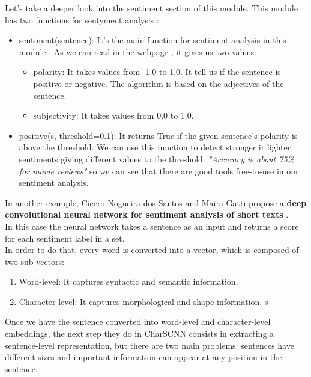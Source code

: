 \documentclass[12pt,twoside]{article}
\theoremstyle{plain}
\theoremstyle{definition}
\theoremstyle{remark}
\begin{document}
		Let's take a deeper look into the sentiment section of this module. This module has two functions for sentyment analysis \cite{python_module_sentiment}:
		
		\begin{itemize}
			\item sentiment(sentence): It's the main function for sentiment analysis in this module . As we can read in the webpage \cite{python_module_sentiment}, it gives us two values:
			
			\begin{itemize}
				\item polarity: It takes values from -1.0 to 1.0. It tell us if the sentence is positive or negative. The algorithm is based on the adjectives of the sentence.
				\item subjectivity: It takes values from 0.0 to 1.0.
			\end{itemize}
			
			\item positive(s, threshold=0.1): It returns True if the given sentence's polarity is above the threshold. We can use this function to detect stronger ir lighter sentiments giving different values to the threshold. \textit{"Accuracy is about 75\% for movie reviews" }\cite{python_module_sentiment} so we can see that there are good tools free-to-use in our sentiment analysis. 
		\end{itemize}
		
		In another example, Cicero Nogueira dos Santos and Maira Gatti propose a \textbf{deep convolutional neural network for sentiment analysis of short texts} \cite{glorot2011domain}.\\
		
		In this case the neural network takes a sentence as an input and returns a score for each sentiment label in a set. \\
		
		In order to do that, every word is converted into a vector, which is composed of two sub-vectors:
		
		\begin{enumerate}
			\item Word-level: It captures syntactic and semantic information.
			\item Character-level: It captures morphological and shape information.
s\end{enumerate}
	
		Once we have the sentence converted into word-level and character-level embeddings, the next step they do in CharSCNN consists in extracting a sentence-level representation, but there are two main problems: sentences have different sizes and important information can appear at any position in the sentence. \\
		
\end{document}
